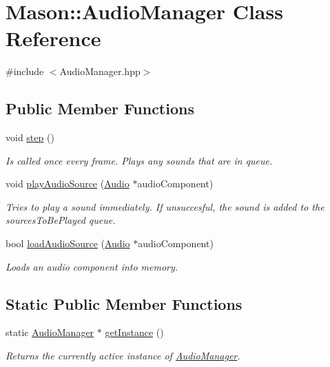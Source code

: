 \hypertarget{class_mason_1_1_audio_manager}{}\section{Mason\+:\+:Audio\+Manager Class Reference}
\label{class_mason_1_1_audio_manager}


{\ttfamily \#include $<$Audio\+Manager.\+hpp$>$}

\subsection*{Public Member Functions}
\begin{DoxyCompactItemize}
\item 
void \hyperlink{class_mason_1_1_audio_manager_a81eb2ff2bc2d1242e532c208b32d17ec}{step} ()
\begin{DoxyCompactList}\small\item\em Is called once every frame. Plays any sounds that are in queue. \end{DoxyCompactList}\item 
void \hyperlink{class_mason_1_1_audio_manager_a061109c8b24705aa7ed1a5c28b9a4cd1}{play\+Audio\+Source} (\hyperlink{class_mason_1_1_audio}{Audio} $\ast$audio\+Component)
\begin{DoxyCompactList}\small\item\em Tries to play a sound immediately. If unsuccesful, the sound is added to the sources\+To\+Be\+Played queue. \end{DoxyCompactList}\item 
bool \hyperlink{class_mason_1_1_audio_manager_ae8264e1149615ee5b3cc54317bd0fe4a}{load\+Audio\+Source} (\hyperlink{class_mason_1_1_audio}{Audio} $\ast$audio\+Component)
\begin{DoxyCompactList}\small\item\em Loads an audio component into memory. \end{DoxyCompactList}\end{DoxyCompactItemize}
\subsection*{Static Public Member Functions}
\begin{DoxyCompactItemize}
\item 
static \hyperlink{class_mason_1_1_audio_manager}{Audio\+Manager} $\ast$ \hyperlink{class_mason_1_1_audio_manager_a77de22887544ce37ae13d7c4d5cf7a79}{get\+Instance} ()
\begin{DoxyCompactList}\small\item\em Returns the currently active instance of \hyperlink{class_mason_1_1_audio_manager}{Audio\+Manager}. \end{DoxyCompactList}\end{DoxyCompactItemize}


